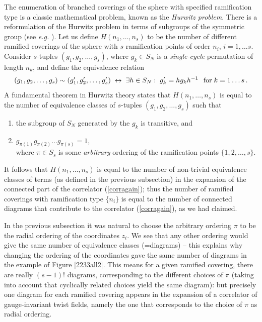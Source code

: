 \documentclass[letterpaper]{JHEP3}
\def\be{\begin{equation}}
\def\ee{\end{equation}}
\def\be{\begin{eqnarray}}
\def\ee{\end{eqnarray}}
\begin{document}
The enumeration of branched coverings of the sphere with specified ramification type is 
a classic mathematical problem, known as the {\it Hurwitz problem}.  There is a 
reformulation of the Hurwitz problem in terms of subgroups of the  symmetric group (see {\it e.g.} \cite{Lando2}).
Let us define $H(n_1, \dots, n_s)$ to be the number of different ramified coverings of the  sphere with $s$ ramification points of order $n_i$, $i=1,\dots s$.
Consider
 $s$-tuples $(g_1, g_2, \dots , g_s )$, where $g_k \in S_N$ is a {\it single-cycle} permutation of length $n_k$, and
define the equivalence relation
\be
(g_1, g_2, \dots , g_s ) \sim (g'_1, g'_2, \dots , g'_s )\;  \leftrightarrow \; 
 \exists h\in S_N: \; g'_k = h g_k h^{-1} \,\;\;  {\rm for} \; k=1\dots s\,.
\ee
A fundamental theorem in Hurwitz theory states that $H(n_1, \dots, n_s)$  is equal to the number of equivalence classes of $s$-tuples  $(g_1, g_2, \dots , g_s )$
such that 
\begin{enumerate} 
\item the   subgroup of $S_N$ generated
by the $g_k$ is transitive, and 
\item
$g_{\pi(1)} g_{\pi(2)} \dots g_{\pi(s)} =1$, \\
where $\pi \in S_s$ is some {\it arbitrary} ordering of the ramification points $\{1, 2, \dots, s\}$.
\end{enumerate}
It  follows that $H(n_1, \dots, n_s)$ is equal to the number of non-trivial equivalence classes 
of terms (as defined in the previous subsection) in the expansion of the connected part of the correlator (\ref{corragain});
 thus the number of ramified coverings with ramification type $\{ n_i \}$ is equal to the number of connected diagrams that contribute to the correlator (\ref{corragain}),
 as we had claimed.
 
 In the previous subsection it was natural to choose the arbitrary ordering $\pi$ 
to be the radial ordering of the coordinates $z_i$. We see that any other ordering would give the same
number of equivalence classes (=diagrams) -- this explains  why changing the ordering of the coordinates
gave the same number of diagrams in the example of Figure \ref{2233all2}. This means
for a given ramified covering,  there are  really $(s-1)!$ diagrams, 
corresponding to the different choices of $\pi$ (taking into account that cyclically related choices yield the same diagram):
but precisely one diagram for each ramified covering appears in the expansion
of a correlator of gauge-invariant twist fields, namely the one that corresponds to the choice of $\pi$ as radial ordering.
\end{document}
